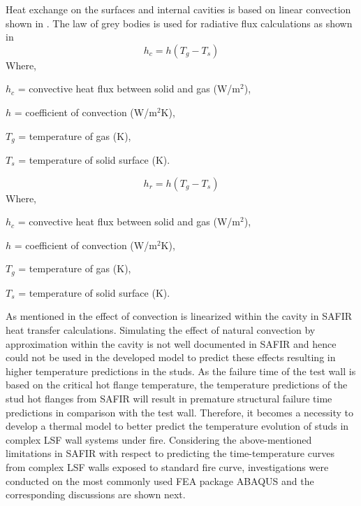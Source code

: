 Heat exchange on the surfaces and internal cavities is based on linear convection shown in . The law of grey bodies is used for radiative flux calculations as shown in 
\begin{equation}\label{eq:safir-convection}
	h_c = h\left(T_g - T_s\right)
\end{equation}
Where,
\begin{description}[itemsep=0pt,parsep=0pt]
	\item $h_c$ = convective heat flux between solid and gas (W/m$^2$),
	\item $h$ = coefficient of convection (W/m$^2$K),
	\item $T_g$ = temperature of gas (K),
	\item $T_s$ = temperature of solid surface (K).
\end{description}
\begin{equation}\label{eq:safir-radiation}
	h_r = h\left(T_g - T_s\right)
\end{equation}
Where,
\begin{description}[itemsep=0pt,parsep=0pt]
	\item $h_c$ = convective heat flux between solid and gas (W/m$^2$),
	\item $h$ = coefficient of convection (W/m$^2$K),
	\item $T_g$ = temperature of gas (K),
	\item $T_s$ = temperature of solid surface (K).
\end{description}

As mentioned in  the effect of convection is linearized within the cavity in SAFIR heat transfer calculations. Simulating the effect of natural convection by approximation within the cavity is not well documented in SAFIR and hence could not be used in the developed model to predict these effects resulting in higher temperature predictions in the studs. As the failure time of the test wall is based on the critical hot flange temperature, the temperature predictions of the stud hot flanges from SAFIR will result in premature structural failure time predictions in comparison with the test wall. Therefore, it becomes a necessity to develop a thermal model to better predict the temperature evolution of studs in complex LSF wall systems under fire. Considering the above-mentioned limitations in SAFIR with respect to predicting the time-temperature curves from complex LSF walls exposed to standard fire curve, investigations were conducted on the most commonly used FEA package ABAQUS and the corresponding discussions are shown next.

